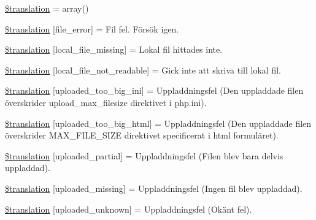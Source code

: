\begin{DoxyCompactItemize}
\item 
\hyperlink{class_8upload_8sv___s_e_8php_a1f198d410fecc3871ebdd468d343a5e3}{\$translation} = array()
\item 
\hyperlink{class_8upload_8sv___s_e_8php_ac7498e49b9771b04698029aa61c70821}{\$translation} \mbox{[}\textquotesingle{}file\+\_\+error\textquotesingle{}\mbox{]} = \textquotesingle{}Fil fel. Försök igen.\textquotesingle{}
\item 
\hyperlink{class_8upload_8sv___s_e_8php_a6ec3d3a47ab70d77e7aa593e82ead10e}{\$translation} \mbox{[}\textquotesingle{}local\+\_\+file\+\_\+missing\textquotesingle{}\mbox{]} = \textquotesingle{}Lokal fil hittades inte.\textquotesingle{}
\item 
\hyperlink{class_8upload_8sv___s_e_8php_a60104befef9b241f3a7a6a755618a4b3}{\$translation} \mbox{[}\textquotesingle{}local\+\_\+file\+\_\+not\+\_\+readable\textquotesingle{}\mbox{]} = \textquotesingle{}Gick inte att skriva till lokal fil.\textquotesingle{}
\item 
\hyperlink{class_8upload_8sv___s_e_8php_a6a08dcd0d3651fdd098568f6b2f0a42c}{\$translation} \mbox{[}\textquotesingle{}uploaded\+\_\+too\+\_\+big\+\_\+ini\textquotesingle{}\mbox{]} = \textquotesingle{}Uppladdningsfel (Den uppladdade filen överskrider upload\+\_\+max\+\_\+filesize direktivet i php.\+ini).\textquotesingle{}
\item 
\hyperlink{class_8upload_8sv___s_e_8php_a623d5b8b92169f57d7e43458aa911cbb}{\$translation} \mbox{[}\textquotesingle{}uploaded\+\_\+too\+\_\+big\+\_\+html\textquotesingle{}\mbox{]} = \textquotesingle{}Uppladdningsfel (Den uppladdade filen överskrider M\+A\+X\+\_\+\+F\+I\+L\+E\+\_\+\+S\+I\+Z\+E direktivet specificerat i html formuläret).\textquotesingle{}
\item 
\hyperlink{class_8upload_8sv___s_e_8php_a967c17da21b0a2d3bd65cca3a9ca0ea8}{\$translation} \mbox{[}\textquotesingle{}uploaded\+\_\+partial\textquotesingle{}\mbox{]} = \textquotesingle{}Uppladdningsfel (Filen blev bara delvis uppladdad).\textquotesingle{}
\item 
\hyperlink{class_8upload_8sv___s_e_8php_a0cce433260be65f1f35853a6b4b8952b}{\$translation} \mbox{[}\textquotesingle{}uploaded\+\_\+missing\textquotesingle{}\mbox{]} = \textquotesingle{}Uppladdningsfel (Ingen fil blev uppladdad).\textquotesingle{}
\item 
\hyperlink{class_8upload_8sv___s_e_8php_a4a9168e922b827e6a28b5db1c00774ca}{\$translation} \mbox{[}\textquotesingle{}uploaded\+\_\+unknown\textquotesingle{}\mbox{]} = \textquotesingle{}Uppladdningsfel (Okänt fel).\textquotesingle{}

\end{DoxyCompactItemize}
